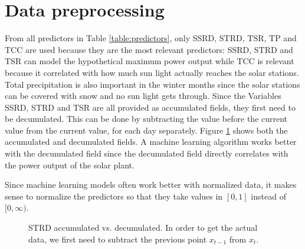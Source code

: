 \section{Data preprocessing}
\label{sec:data-preprocessing}

From all predictors in Table \ref{table:predictors}, only SSRD, STRD, TSR, TP and TCC are used 
because they are the most relevant predictors: SSRD, STRD and TSR can model the hypothetical maximum power 
output while TCC is relevant because it correlated with how much sun light actually reaches the solar stations. 
Total precipitation is also important in the winter months since the solar stations can be covered with snow and no sun light gets through.
Since the Variables SSRD, STRD and TSR are all provided as accumulated fields, they first need to be decumulated.
This can be done by subtracting the value before the current value from the current value, for each day separately. 
Figure \ref{fig:strd-accumulated-vs-decumulated} shows both the accumulated and decumulated fields. 
A machine learning algorithm works better with the decumulated field since the decumulated field directly correlates 
with the power output of the solar plant.

Since machine learning models often work better with normalized data, it makes sense to normalize the predictors 
so that they take values in \([0,1]\) instead of \([0,\infty)\). 

\begin{figure}[h]%
    \centering
    \qquad
    \caption[STRD accumulated vs. decumulated]{STRD accumulated vs. decumulated. 
    In order to get the actual data, we first need to subtract the previous point \(x_{t-1}\) from \(x_t\).}%
    \label{fig:strd-accumulated-vs-decumulated}%
\end{figure}